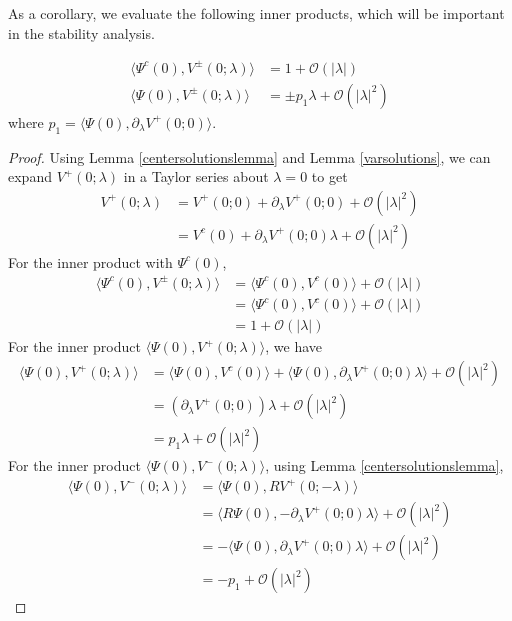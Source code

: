 \documentclass[thesis.tex]{subfiles}
\begin{document}
As a corollary, we evaluate the following inner products, which will be important in the stability analysis.

\begin{corollary}\label{VpmPsiIPcorr}
\begin{equation}\label{VpmIPs}
\begin{aligned}
\langle \Psi^c(0), V^\pm(0; \lambda) \rangle &= 1 + \mathcal{O}(|\lambda|) \\
\langle \Psi(0), V^\pm(0; \lambda) \rangle &= \pm p_1 \lambda + \mathcal{O}(|\lambda|^2)
\end{aligned}
\end{equation}
where $p_1 = \langle \Psi(0), \partial_\lambda V^+(0; 0) \rangle$.
\begin{proof}
Using Lemma \ref{centersolutionslemma} and Lemma \ref{varsolutions}, we can expand $V^+(0; \lambda)$ in a Taylor series about $\lambda = 0$ to get
\begin{align*}
V^+(0; \lambda) &= V^+(0; 0) + \partial_\lambda V^+(0; 0) + \mathcal{O}(|\lambda|^2) \\
&= V^c(0) + \partial_\lambda V^+(0; 0) \lambda + \mathcal{O}(|\lambda|^2) 
\end{align*}
For the inner product with $\Psi^c(0)$,
\begin{align*}
\langle \Psi^c(0), V^\pm(0; \lambda) \rangle &= 
\langle \Psi^c(0), V^c(0) \rangle + \mathcal{O}(|\lambda|) \\
&= \langle \Psi^c(0), V^c(0) \rangle + \mathcal{O}(|\lambda|) \\
&= 1 + \mathcal{O}(|\lambda|)
\end{align*}
For the inner product $\langle \Psi(0), V^+(0; \lambda) \rangle$, we have
\begin{align*}
\langle \Psi(0), V^+(0; \lambda) \rangle 
&= \langle \Psi(0), V^c(0) \rangle + \langle \Psi(0), \partial_\lambda V^+(0; 0) \lambda \rangle + \mathcal{O}(|\lambda|^2) \\
&= (\partial_\lambda V^+(0; 0)) \lambda + \mathcal{O}(|\lambda|^2) \\
&= p_1 \lambda + \mathcal{O}(|\lambda|^2)
\end{align*}
For the inner product $\langle \Psi(0), V^-(0; \lambda) \rangle$, using Lemma \ref{centersolutionslemma},
\begin{align*}
\langle \Psi(0), V^-(0; \lambda) \rangle &= 
\langle \Psi(0), R V^+(0; -\lambda) \rangle \\
&= \langle R \Psi(0), -\partial_\lambda V^+(0; 0) \lambda \rangle + \mathcal{O}(|\lambda|^2) \\
&= -\langle \Psi(0), \partial_\lambda V^+(0; 0) \lambda \rangle + \mathcal{O}(|\lambda|^2) \\
&= -p_1 + \mathcal{O}(|\lambda|^2)
\end{align*}
\end{proof}
\end{corollary}
\end{document}
